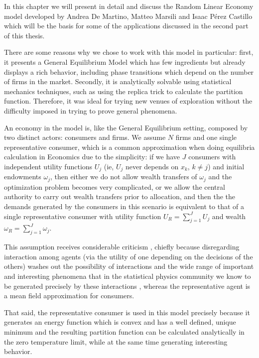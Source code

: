 In this chapter we will present in detail and discuss the Random
Linear Economy model \cite{DeMartinoMarsili04} developed by Andrea De
Martino, Matteo Marsili and Isaac Pérez Castillo which will be the
basis for some of the applications discussed in the second part of
this thesis.

There are some reasons why we chose to work with this model in
particular: first, it presents a General Equilibrium Model which has
few ingredients but already displays a rich behavior, including phase
transitions which depend on the number of firms in the
market. Secondly, it is analytically solvable using statistical
mechanics techniques, such as using the replica trick to calculate the
partition function. Therefore, it was ideal for trying new venues of
exploration without the difficulty imposed in trying to prove general
phenomena. 

An economy in the model is, like the General Equilibrium setting,
composed by two distinct actors: consumers and firms. We assume $N$
firms and one single representative consumer, which is a common
approximation when doing equilibria calculation in Economics due to
the simplicity: if we have $J$ consumers with independent
utility functions $U_j$ (ie, $U_j$ never depends on $x_k$, $k\neq j$)
and initial endowments $\omega_j$, then either we do not allow wealth
transfers of $\omega_j$ and the optimization problem becomes very
complicated, or we allow the central authority to carry out wealth
transfers prior to allocation, and then the the demands generated by
the consumers in this scenario is equivalent to that of a single
representative consumer with utility function $U_R = \sum_{j=1}^J U_j$
and wealth $\omega_R = \sum_{j=1}^J \omega_j$.

This assumption receives considerable criticism \cite{Kirman92},
chiefly because disregarding interaction among agents (via the utility
of one depending on the decisions of the others) washes out the
possibility of interactions and the wide range of important and
interesting phenomena that in the statistical physics community we
know to be generated precisely by these interactions
\cite{Bouchaud13}, whereas the representative agent is a mean field
approximation for consumers.

That said, the representative consumer is used in this model precisely
because it generates an energy function which is convex and has a
well defined, unique minimum and the resulting partition function can
be calculated analytically in the zero temperature limit, while at the
same time generating interesting behavior.

